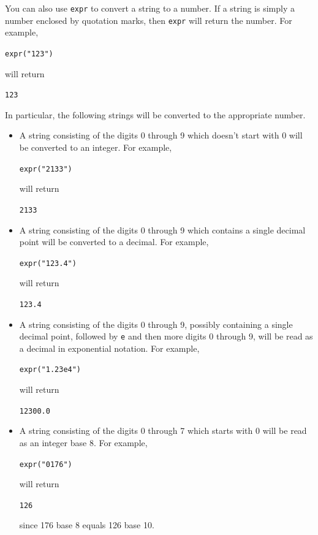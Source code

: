 \documentclass[a4paper,11pt]{book}
\begin{document}
You can also use \texttt{expr} to convert a string to a number.
If a string is simply a number enclosed by quotation marks, then
\texttt{expr} will return the number.  For example,
\begin{center}
  {\tt expr("123")}
\end{center}
will return 
\begin{center}
  {\tt 123}
\end{center}
In particular, the following strings will be converted to the
appropriate number.
\begin{itemize}
  \item
  A string consisting of the digits 0 through 9 which doesn't start
  with 0 will be converted to an integer.  For example,
  \begin{center}
    {\tt expr("2133")}
  \end{center}
  will return
  \begin{center}
    {\tt 2133}
  \end{center}

  \item
  A string consisting of the digits 0 through 9 which contains a
  single decimal point will be converted to a decimal.
   For example,
  \begin{center}
    {\tt expr("123.4")}
  \end{center}
  will return
  \begin{center}
    {\tt 123.4}
  \end{center}

  \item
  A string consisting of the digits 0 through 9, possibly containing a
  single decimal point, followed by \texttt{e} and then more digits 0
  through 9, will be read as a decimal in exponential notation.
  For example,
  \begin{center}
    {\tt expr("1.23e4")}
  \end{center}
  will return
  \begin{center}
    {\tt 12300.0}
  \end{center}

  \item  
  A string consisting of the digits 0 through 7 which  starts
  with 0 will be read as an integer base 8.  For example,
  \begin{center}
    {\tt expr("0176")}
  \end{center}
  will return
  \begin{center}
    {\tt 126}
  \end{center}
  since 176 base 8 equals 126 base 10.
  

\end{itemize}
\end{document}

